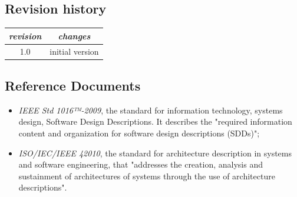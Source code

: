 \documentclass{article}
\begin{document}
\subsection{Revision history}
\raggedright
\begin{tabular}{ |c | c |}
\hline
 \textit{revision} & \textit{changes} \\ 
 \hline
 1.0 &  initial version\\ 
 \hline
\end{tabular}
\subsection{Reference Documents}
\begin{itemize}
    \item \textit{IEEE Std 1016™-2009}, the standard for information technology, systems design, Software Design Descriptions. It describes the "required information content and organization for software design descriptions (SDDs)";
    \item \textit{ISO/IEC/IEEE 42010}, the standard for architecture description in systems and software engineering, that "addresses the creation, analysis and sustainment of architectures of systems
through the use of architecture descriptions".
\end{itemize}
\end{document}

